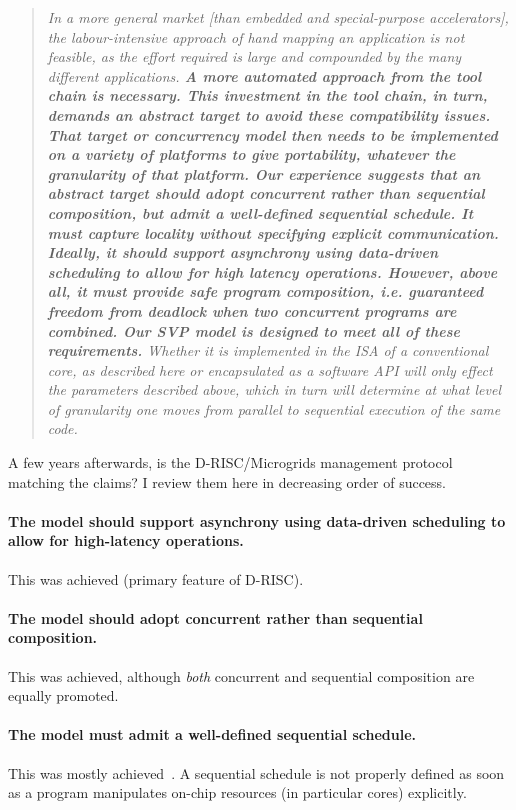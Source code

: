 \begin{quote}
\itshape In a more general market [than embedded and special-purpose
  accelerators], the labour-intensive approach of hand mapping an
application is not feasible, as the effort required is large and
compounded by the many different applications. {\bfseries A more automated
approach from the tool chain is necessary. This investment in the tool
chain, in turn, demands an abstract target to avoid these
compatibility issues. That target or concurrency model then needs to
be implemented on a variety of platforms to give portability, whatever
the granularity of that platform.  Our experience suggests that an
abstract target should adopt concurrent rather than sequential
composition, but admit a well-defined sequential schedule. It must
capture locality without specifying explicit communication. Ideally,
it should support asynchrony using data-driven scheduling to allow for
high latency operations. However, above all, it must provide safe
program composition, i.e. guaranteed freedom from deadlock when two
concurrent programs are combined. Our SVP model is designed to meet
all of these requirements.} Whether it is implemented in the ISA of a
conventional core, as described here or encapsulated as a software API
will only effect the parameters described above, which in turn will
determine at what level of granularity one moves from parallel to
sequential execution of the same code.
\end{quote}

A few years afterwards, is the D-RISC/Microgrids management protocol
matching the claims? I review them here in decreasing order of
success.

\paragraph{The model should support asynchrony using data-driven scheduling to
allow for high-latency operations.} This was achieved (primary feature of D-RISC).

\paragraph{The model should adopt concurrent rather than sequential composition.}
This was achieved, although \emph{both} concurrent and sequential composition are equally promoted.

\paragraph{The model must admit a well-defined sequential schedule.}
This was mostly achieved~\cite[Chap.~10]{poss.12}. A sequential schedule is not properly defined
as soon as a program manipulates on-chip resources (in particular cores) explicitly.

